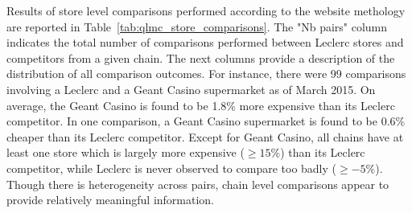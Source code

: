 \documentclass[english]{article}
\begin{document}
Results of store level comparisons performed according to the website methology are reported in Table~\ref{tab:qlmc_store_comparisons}. The "Nb pairs" column indicates the total number of comparisons performed between Leclerc stores and competitors from a given chain. The next columns provide a description of the distribution of all comparison outcomes. For instance, there were 99 comparisons involving a Leclerc and a Geant Casino supermarket as of March 2015. On average, the Geant Casino is found to be 1.8\% more expensive than its Leclerc competitor. In one comparison, a Geant Casino supermarket is found to be 0.6\% cheaper than its Leclerc competitor. Except for Geant Casino, all chains have at least one store which is largely more expensive ($\ge 15\%$) than its Leclerc competitor, while Leclerc is never observed to compare too badly ($\ge -5 \%$). Though there is heterogeneity across pairs, chain level comparisons appear to provide relatively meaningful information.
\end{document}
